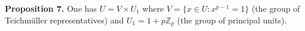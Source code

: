 \textbf{Proposition 7.} One has $U = V \times U_1$ where $V = \{x \in U : x^{p-1} = 1\}$ (the group of Teichmüller representatives) and $U_1 = 1 + p\mathbb{Z}_p$ (the group of principal units).
